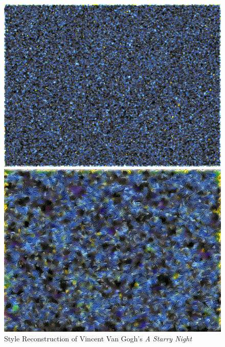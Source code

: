 \documentclass{article}
\begin{document}
\begin{figure}
\centering
\caption{Style Reconstruction of Vincent Van Gogh's \textit{A Starry Night}}
\label{fig:style-reconstruction}

    \begin{minipage}{0.3\linewidth}
    \includegraphics[width=\textwidth]{img/style/block1_conv1}
    \end{minipage}
    \begin{minipage}{0.3\linewidth}
    \includegraphics[width=\textwidth]{img/style/block2_conv1}
    \end{minipage}
    \begin{minipage}{0.3\linewidth}

\end{minipage}
\end{figure}
\end{document}
